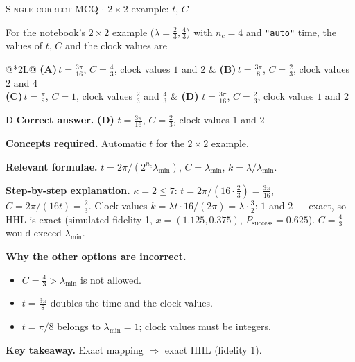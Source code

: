 \documentclass[11pt,a4paper]{article}
\newcommand{\optlabel}[1]{\textbf{(#1)}}
\newcommand{\correctlabel}[1]{\textcolor{okgreen}{\textbf{(#1)}\,\ding{51}}}
\newenvironment{qitem}[1]{\begin{list}{}{\setlength{\leftmargin}{3.3em}\setlength{\labelwidth}{3.1em}%
  \setlength{\labelsep}{0.2em}\setlength{\topsep}{3pt}\setlength{\parsep}{3pt}}\item[\textbf{Q.#1}\hfill]}{\end{list}}
\newcommand{\qsep}{\par\vspace{2pt}{\color{black!15}\hrule}\vspace{4pt}}
\newcommand{\qmeta}[2]{{\footnotesize\color{black!60}\textsc{#1} \;$\cdot$\; #2}\par}
\begin{document}
\begin{qitem}{53}
\qmeta{Single-correct MCQ}{$2\times2$ example: $t$, $C$}
For the notebook's $2\times2$ example ($\lambda = \tfrac23, \tfrac43$) with $n_c = 4$ and \texttt{"auto"} time, the values of $t$, $C$ and the clock values are
\par\smallskip\noindent\begin{tabularx}{\linewidth}{@{}*{2}{L}@{}}
\optlabel{A}\,$t = \tfrac{3\pi}{16}$, $C = \tfrac43$, clock values $1$ and $2$ & \optlabel{B}\,$t = \tfrac{3\pi}{8}$, $C = \tfrac23$, clock values $2$ and $4$ \\[3pt]
\optlabel{C}\,$t = \tfrac\pi8$, $C = 1$, clock values $\tfrac23$ and $\tfrac43$ & \correctlabel{D}\,$t = \tfrac{3\pi}{16}$, $C = \tfrac23$, clock values $1$ and $2$
\end{tabularx}
\end{qitem}
\begin{solbox}{D}
\textbf{\color{brand}Correct answer.} \textcolor{okgreen}{\textbf{(D)}} $t = \tfrac{3\pi}{16}$, $C = \tfrac23$, clock values $1$ and $2$

\textbf{\color{brand}Concepts required.} Automatic $t$ for the $2\times2$ example.

\textbf{\color{brand}Relevant formulae.} $t = 2\pi/(2^{n_c}\lambda_{\min})$, $C = \lambda_{\min}$, $k = \lambda/\lambda_{\min}$.

\textbf{\color{brand}Step-by-step explanation.} $\kappa = 2 \le 7$: $t = 2\pi/(16\cdot\tfrac23) = \tfrac{3\pi}{16}$, $C = 2\pi/(16t) = \tfrac23$. Clock values $k = \lambda t\cdot16/(2\pi) = \lambda\cdot\tfrac32$: $1$ and $2$ --- exact, so HHL is exact (simulated fidelity 1,
$x = (1.125, 0.375)$, $P_{\text{success}} = 0.625$). $C = \tfrac43$ would exceed $\lambda_{\min}$.

\textbf{\color{brand}Why the other options are incorrect.}
\begin{itemize}[leftmargin=2.4em, itemsep=1pt, topsep=2pt]
\item[\textbf{(A)}] $C = \frac43 > \lambda_{\min}$ is not allowed.
\item[\textbf{(B)}] $t = \frac{3\pi}{8}$ doubles the time and the clock values.
\item[\textbf{(C)}] $t = \pi/8$ belongs to $\lambda_{\min} = 1$; clock values must be integers.
\end{itemize}
\textbf{\color{brand}Key takeaway.} Exact mapping $\Rightarrow$ exact HHL (fidelity 1).
\end{solbox}
\qsep
\end{document}
